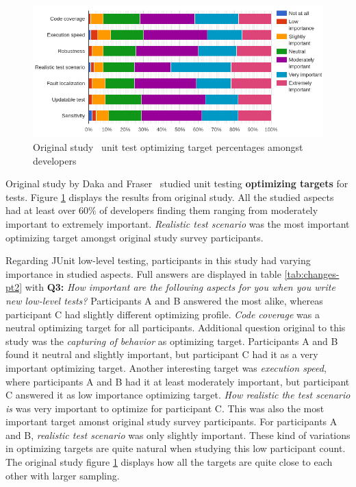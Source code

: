     \begin{figure}[H]
      \begin{center}
        \includegraphics[width=14.7cm]{images/optimize-org.png}
        \caption{Original study~\cite{daka2014survey} unit test optimizing target percentages amongst developers}
        \label{fig:org-optimize}
      \end{center}
    \end{figure}
Original study by Daka and Fraser~\cite{daka2014survey} studied unit testing \textbf{optimizing targets} for tests. Figure \ref{fig:org-optimize}
displays the results from original study. All the studied aspects had at least over 60\% of developers finding them ranging
from moderately important to extremely important. \textit{Realistic test scenario} was the most important optimizing target
amongst original study survey participants.


Regarding JUnit low-level testing, participants in this study had varying importance in studied aspects. Full answers are
displayed in table \ref{tab:changes-pt2} with \textbf{Q3:} \textit{How important are the following aspects for you when you write new low-level tests?}
Participants A and B answered
the most alike, whereas participant C had slightly different optimizing profile. \textit{Code coverage}
was a neutral optimizing target for all participants. Additional question original to this study was the \textit{capturing of behavior}
as optimizing target. Participants A and B found it neutral and slightly important,
but participant C had it as a very important optimizing target. Another interesting target was \textit{execution speed},
where participants A and B had it at least moderately important, but participant C
answered it as low importance optimizing target. \textit{How realistic the test scenario is} was very important to optimize for
participant C. This was also the most important target amonst original study survey participants.
For participants A and B, \textit{realistic test scenario} was only slightly important.
These kind of variations in optimizing targets are quite natural when studying this low participant count. The original study
figure \ref{fig:org-optimize} displays how all the targets are quite close to each other with larger sampling.


